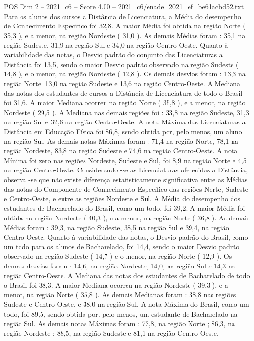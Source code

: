 \begin{textsample}{POS Dim 2 – 2021\_c6 – Score 4.00 – 2021\_c6/enade\_2021\_ef\_be61acbd52.txt}
Para os alunos dos cursos a Distância de Licenciatura, a Média do desempenho de Conhecimento Específico foi 32,8.
A maior Média foi obtida na região Norte ( 35,3 ), e a menor, na região Nordeste ( 31,0 ).
As demais Médias foram : 35,1 na região Sudeste, 31,9 na região Sul e 34,0 na região Centro-Oeste.
Quanto à variabilidade das notas, o Desvio padrão do conjunto das Licenciaturas a Distância foi 13,5, sendo o maior Desvio padrão observado na região Sudeste ( 14,8 ), e o menor, na região Nordeste ( 12,8 ).
Os demais desvios foram : 13,3 na região Norte, 13,0 na região Sudeste e 13,6 na região Centro-Oeste.
A Mediana das notas dos estudantes de cursos a Distância de Licenciatura de todo o Brasil foi 31,6.
A maior Mediana ocorreu na região Norte ( 35,8 ), e a menor, na região Nordeste ( 29,5 ).
A Mediana nas demais regiões foi : 33,8 na região Sudeste, 31,3 na região Sul e 32,6 na região Centro-Oeste.
A nota Máxima das Licenciaturas a Distância em Educação Física foi 86,8, sendo obtida por, pelo menos, um aluno na região Sul.
As demais notas Máximas foram : 71,4 na região Norte, 78,1 na região Nordeste, 83,8 na região Sudeste e 74,6 na região Centro-Oeste.
A nota Mínima foi zero nas regiões Nordeste, Sudeste e Sul, foi 8,9 na região Norte e 4,5 na região Centro-Oeste.
Considerando -se as Licenciaturas oferecidas a Distância, observa -se que não existe diferença estatisticamente significativa entre as Médias das notas do Componente de Conhecimento Específico das regiões Norte, Sudeste e Centro-Oeste, e entre as regiões Nordeste e Sul.
A Média do desempenho dos estudantes de Bacharelado do Brasil, como um todo, foi 39,2.
A maior Média foi obtida na região Nordeste ( 40,3 ), e a menor, na região Norte ( 36,8 ).
As demais Médias foram : 39,3, na região Sudeste, 38,5 na região Sul e 39,4, na região Centro-Oeste.
Quanto à variabilidade das notas, o Desvio padrão do Brasil, como um todo para os alunos de Bacharelado, foi 14,4, sendo o maior Desvio padrão observado na região Sudeste ( 14,7 ) e o menor, na região Norte ( 12,9 ).
Os demais desvios foram : 14,6, na região Nordeste, 14,0, na região Sul e 14,3 na região Centro-Oeste.
A Mediana das notas dos estudantes de Bacharelado de todo o Brasil foi 38,3.
A maior Mediana ocorreu na região Nordeste ( 39,3 ), e a menor, na região Norte ( 35,8 ).
As demais Medianas foram : 38,8 nas regiões Sudeste e Centro-Oeste, e 38,0 na região Sul.
A nota Máxima do Brasil, como um todo, foi 89,5, sendo obtida por, pelo menos, um estudante de Bacharelado na região Sul.
As demais notas Máximas foram : 73,8, na região Norte ; 86,3, na região Nordeste ; 88,5, na região Sudeste e 81,1 na região Centro-Oeste.

\end{textsample}
